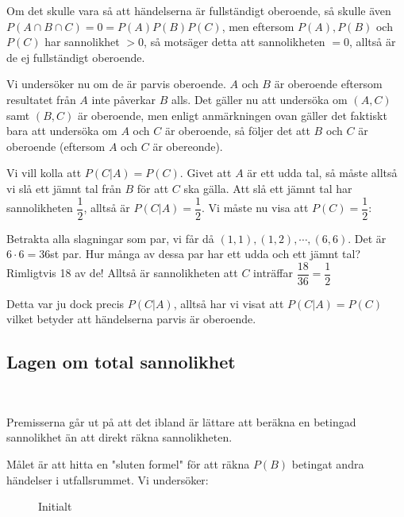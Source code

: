 \noindent Om det skulle vara så att händelserna är fullständigt oberoende, så skulle även $P(A\cap B\cap C) = 0 = P(A)P(B)P(C)$, men eftersom $P(A), P(B)$ och $P(C)$ har sannolikhet $>0$, så motsäger detta att sannolikheten $=0$, alltså är de ej fullständigt oberoende.
\par\bigskip
\noindent Vi undersöker nu om de är parvis oberoende. $A$ och $B$ är oberoende eftersom resultatet från $A$ inte påverkar $B$ alls. Det gäller nu att undersöka om $(A,C)$ samt $(B,C)$ är oberoende, men enligt anmärkningen ovan gäller det faktiskt bara att undersöka om $A$ och $C$ är oberoende, så följer det att $B$ och $C$ är oberoende (eftersom $A$ och $C$ är obereonde).\par
\noindent Vi vill kolla att $P(C|A) = P(C)$. Givet att $A$ är ett udda tal, så måste alltså vi slå ett jämnt tal från $B$ för att $C$ ska gälla. Att slå ett jämnt tal har sannolikheten $\dfrac{1}{2}$, alltså är $P(C|A) = \dfrac{1}{2}$. Vi måste nu visa att $P(C) = \dfrac{1}{2}$:\par
\noindent Betrakta alla slagningar som par, vi får då $(1,1),(1,2),\cdots,(6,6)$. Det är $6\cdot6=36$st par. Hur många av dessa par har ett udda och ett jämnt tal? Rimligtvis 18 av de! Alltså är sannolikheten att $C$ inträffar $\dfrac{18}{36} = \dfrac{1}{2}$\par
\noindent Detta var ju dock precis $P(C|A)$, alltså har vi visat att $P(C|A) = P(C)$ vilket betyder att händelserna parvis är oberoende.
\par\bigskip
\subsection{Lagen om total sannolikhet}\hfill\\\par
\noindent Premisserna går ut på att det ibland är lättare att beräkna en betingad sannolikhet än att direkt räkna sannolikheten.\par
\noindent Målet är att hitta en "sluten formel" för att räkna $P(B)$ betingat andra händelser i utfallsrummet. Vi undersöker:\par
\begin{figure}[ht]
    \centering
    \caption{Initialt}
    \label{fig:initialt}
\end{figure}
\par\bigskip
